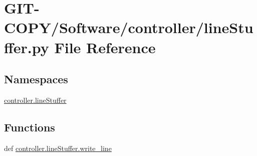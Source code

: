 \hypertarget{GIT-COPY_2Software_2controller_2lineStuffer_8py}{}\section{G\+I\+T-\/\+C\+O\+P\+Y/\+Software/controller/line\+Stuffer.py File Reference}
\label{GIT-COPY_2Software_2controller_2lineStuffer_8py}
\subsection*{Namespaces}
\begin{DoxyCompactItemize}
\item 
 \hyperlink{namespacecontroller_1_1lineStuffer}{controller.\+line\+Stuffer}
\end{DoxyCompactItemize}
\subsection*{Functions}
\begin{DoxyCompactItemize}
\item 
def \hyperlink{namespacecontroller_1_1lineStuffer_a7ecbdc355c9794220a2b3ddf49ee193e}{controller.\+line\+Stuffer.\+write\+\_\+line}
\end{DoxyCompactItemize}
